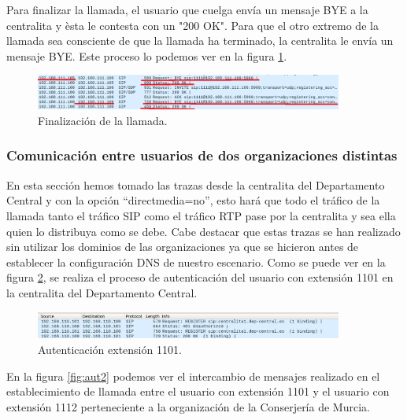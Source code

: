 \documentclass[a4paper]{article}
\begin{document}
Para finalizar la llamada, el usuario que cuelga envía un mensaje BYE a la centralita y èsta le contesta con un "200 OK". Para que el otro extremo de la llamada sea consciente de que la llamada ha terminado, la centralita le envía un mensaje BYE. Este proceso lo podemos ver en la figura \ref{fig:byess}.

\begin{figure}[htb]
    \begin{center}
        \includegraphics[width=0.9\textwidth]{byes.png}
        \caption{Finalización de la llamada.}
         \label{fig:byess}
    \end{center}
\end{figure}

\newpage
\subsubsection{Comunicación entre usuarios de dos organizaciones distintas}
En esta sección hemos tomado las trazas desde la centralita del Departamento Central y con la opción ``directmedia=no'', esto hará que todo el tráfico de la llamada tanto el tráfico SIP como el tráfico RTP pase por la centralita y sea ella quien lo distribuya como se debe. Cabe destacar que estas trazas se han realizado sin utilizar los dominios de las organizaciones ya que se hicieron antes de establecer la configuración DNS de nuestro escenario. Como se puede ver en la figura \ref{fig:register2}, se realiza el proceso de autenticación del usuario con extensión 1101 en la centralita del Departamento Central.


\begin{figure}[htb]
    \begin{center}
        \includegraphics[width=0.9\textwidth]{1112-1101.png}
        \caption{Autenticación extensión 1101.}
         \label{fig:register2}
    \end{center}
\end{figure}


 En la figura \ref{fig:aut2} podemos ver el intercambio de mensajes realizado en el establecimiento de llamada entre el usuario con extensión 1101 y el usuario con extensión 1112 perteneciente a la organización de la Conserjería de Murcia. 
\end{document}
